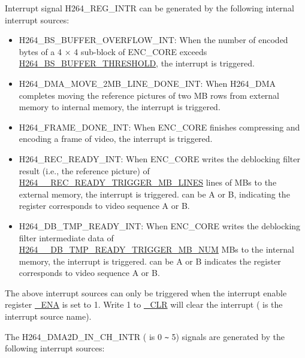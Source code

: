\documentclass[main\_\_EN.tex]{subfiles}
\begin{document}
Interrupt signal \label{int:H264REGINT}H264\_REG\_INTR can be generated by the following internal interrupt sources:
\begin{itemize}
\item \label{int:H264BSBUFFEROVERFLOWINT}H264\_BS\_BUFFER\_OVERFLOW\_INT: When the number of encoded bytes of a 4 × 4 sub-block of ENC\_CORE exceeds \hyperref[fielddesc:H264BSBUFFERTHRESHOLD]{H264\_BS\_BUFFER\_THRESHOLD}, the interrupt is triggered.
\item \label{int:H264DMAMOVE2MBLINEDONEINT}H264\_DMA\_MOVE\_2MB\_LINE\_DONE\_INT: When H264\_DMA completes moving the reference pictures of two MB rows from external memory to internal memory, the interrupt is triggered.
\item \label{int:H264FRAMEDONEINT}H264\_FRAME\_DONE\_INT: When ENC\_CORE finishes compressing and encoding a frame of video, the interrupt is triggered.
\item \label{int:H264RECREADYINT}H264\_REC\_READY\_INT: When ENC\_CORE writes the deblocking filter result (i.e., the reference picture) of \hyperref[fielddesc:H264ARECREADYTRIGGERMBLINES]{H264\_\_REC\_READY\_TRIGGER\_MB\_LINES} lines of MBs to the external memory, the interrupt is triggered.  can be A or B, indicating the register corresponds to video sequence A or B.
\item \label{int:H264DBTMPREADYINT}H264\_DB\_TMP\_READY\_INT: When ENC\_CORE writes the deblocking filter intermediate data of \hyperref[fielddesc:H264ADBTMPREADYTRIGGERMBNUM]{H264\_\_DB\_TMP\_READY\_TRIGGER\_MB\_NUM} MBs to the internal memory, the interrupt is triggered.  can be A or B indicates the register corresponds to video sequence A or B.
\end{itemize}

The above interrupt sources can only be triggered when the interrupt enable register \hyperref[fielddesc:H264DMAMOVE2MBLINEDONEINTENA]{\_ENA} is set to 1. Write 1 to \hyperref[fielddesc:H264DMAMOVE2MBLINEDONEINTCLR]{\_CLR} will clear the interrupt ( is the interrupt source name).

The \label{int:H264DMAINCHNINT}H264\_DMA2D\_IN\_CH{}\_INTR ( is 0 \verb+~+ 5) signals are generated by the following interrupt sources:
\end{document}
